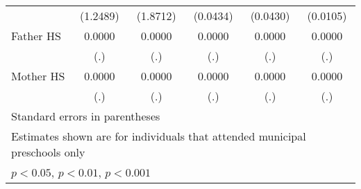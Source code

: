\begin{table}[htbp]
\begin{tabular}{l*{5}{c}}
            &    (1.2489)         &    (1.8712)         &    (0.0434)         &    (0.0430)         &    (0.0105)         \\
\addlinespace
Father HS   &      0.0000         &      0.0000         &      0.0000         &      0.0000         &      0.0000         \\
            &         (.)         &         (.)         &         (.)         &         (.)         &         (.)         \\
\addlinespace
Mother HS   &      0.0000         &      0.0000         &      0.0000         &      0.0000         &      0.0000         \\
            &         (.)         &         (.)         &         (.)         &         (.)         &         (.)         \\
\bottomrule
\multicolumn{6}{l}{\footnotesize Standard errors in parentheses}\\
\multicolumn{6}{l}{\footnotesize Estimates shown are for individuals that attended municipal preschools only}\\
\multicolumn{6}{l}{\footnotesize \sym{*} \(p<0.05\), \sym{**} \(p<0.01\), \sym{***} \(p<0.001\)}\\
\end{tabular}
\end{table}
